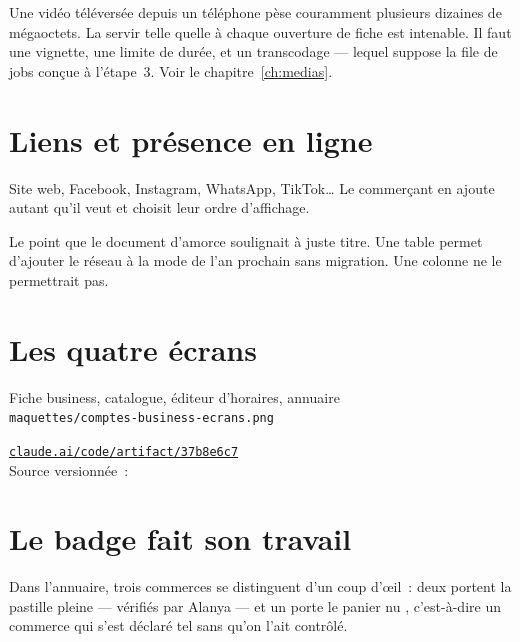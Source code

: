 \begin{alerte}
Une vidéo téléversée depuis un téléphone pèse couramment plusieurs dizaines de mégaoctets.
La servir telle quelle à chaque ouverture de fiche est intenable. Il faut une vignette, une
limite de durée, et un transcodage --- lequel suppose la file de jobs conçue à l'étape~3.
Voir le chapitre~\ref{ch:medias}.
\end{alerte}

\section{Liens et présence en ligne}

Site web, Facebook, Instagram, WhatsApp, TikTok\ldots{} Le commerçant en ajoute autant qu'il
veut et choisit leur ordre d'affichage.

\begin{note}
Le point que le document d'amorce soulignait à juste titre. Une table
 permet d'ajouter le réseau à la mode de l'an
prochain sans migration. Une colonne  ne le permettrait pas.
\end{note}

\section{Les quatre écrans}

\begin{center}
    {Fiche business, catalogue, éditeur d'horaires, annuaire\\
     \texttt{maquettes/comptes-business-ecrans.png}}
\end{center}

\begin{note}
\href{https://claude.ai/code/artifact/37b8e6c7-1235-42df-aabc-d66b8f26ff67}%
{\texttt{claude.ai/code/artifact/37b8e6c7}}\\
Source versionnée~: 
\end{note}

\section{Le badge fait son travail}

Dans l'annuaire, trois commerces se distinguent d'un coup d'{\oe}il~: deux portent la
pastille pleine \badgePastillePanier[1] --- vérifiés par Alanya --- et un porte le panier nu
\badgePanier[1], c'est-à-dire un commerce qui s'est déclaré tel sans qu'on l'ait contrôlé.

